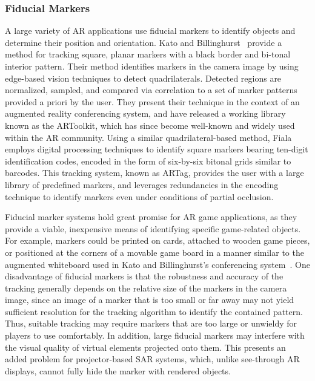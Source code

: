 \documentclass{thesis}
\begin{document}
\subsubsection{Fiducial Markers}

A large variety of AR applications use fiducial markers to identify objects and determine their position and orientation. Kato and Billinghurst~\cite{Kato1999} provide a method for tracking square, planar markers with a black border and bi-tonal interior pattern. Their method identifies markers in the camera image by using edge-based vision techniques to detect quadrilaterals. Detected regions are normalized, sampled, and compared via correlation to a set of marker patterns provided a priori by the user. They present their technique in the context of an augmented reality conferencing system, and have released a working library known as the ARToolkit, which has since become well-known and widely used within the AR community. Using a similar quadrilateral-based method, Fiala~\cite{Fiala2005} employs digital processing techniques to identify square markers bearing ten-digit identification codes, encoded in the form of six-by-six bitonal grids similar to barcodes. This tracking system, known as ARTag, provides the user with a large library of predefined markers, and leverages redundancies in the encoding technique to identify markers even under conditions of partial occlusion.

Fiducial marker systems hold great promise for AR game applications, as they provide a viable, inexpensive means of identifying specific game-related objects. For example, markers could be printed on cards, attached to wooden game pieces, or positioned at the corners of a movable game board in a manner similar to the augmented whiteboard used in Kato and Billinghurst's conferencing system~\cite{Kato1999}. 
One disadvantage of fiducial markers is that the robustness and accuracy of the tracking generally depends on the relative size of the markers in the camera image, since an image of a marker that is too small or far away may not yield sufficient resolution for the tracking algorithm to identify the contained pattern. Thus, suitable tracking may require markers that are too large or unwieldy for players to use comfortably. In addition, large fiducial markers may interfere with the visual quality of virtual elements projected onto them. This presents an added problem for projector-based SAR systems, which, unlike see-through AR displays, cannot fully hide the marker with rendered objects.
\end{document}
